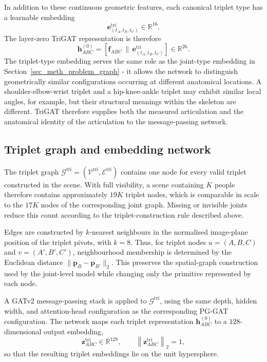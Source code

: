 In addition to these continuous geometric features,
each canonical triplet type has a learnable embedding
\begin{equation}
    \mathbf{e}^{\mathrm{tri}}_{(t_A,t_B,t_C)}
    \in\mathbb{R}^{16}.
\end{equation}
The layer-zero TriGAT representation is therefore
\begin{equation}
    \mathbf{h}^{(0)}_{ABC}
    =
    \left[
        \mathbf{f}_{ABC}
        \,\big\|\,
        \mathbf{e}^{\mathrm{tri}}_{(t_A,t_B,t_C)}
    \right]
    \in\mathbb{R}^{26}.
    \label{eq:trigat_layer0}
\end{equation}
The triplet-type embedding serves the same role
as the joint-type embedding in Section~\ref{sec_meth_problem_graph} -
it allows the network to distinguish geometrically similar
configurations occurring at different anatomical locations.
A shoulder-elbow-wrist triplet and a hip-knee-ankle triplet
may exhibit similar local angles, for example,
but their structural meanings within the skeleton are different.
TriGAT therefore supplies both the measured articulation
and the anatomical identity of the articulation
to the message-passing network.

\subsection{Triplet graph and embedding network}
\label{sec_meth_trigat_arch}

The triplet graph
$\mathcal{G}^{\mathrm{tri}}
= (\mathcal{V}^{\mathrm{tri}},\mathcal{E}^{\mathrm{tri}})$
contains one node for every valid triplet constructed in the scene.
With full visibility, a scene containing $K$ people therefore contains
approximately $19K$ triplet nodes, which is comparable in scale to the
$17K$ nodes of the corresponding joint graph. Missing or invisible
joints reduce this count according to the triplet-construction rule
described above.

Edges are constructed by $k$-nearest neighbours in the normalised
image-plane position of the triplet pivots, with $k=8$. Thus, for
triplet nodes $u=(A,B,C)$ and $v=(A',B',C')$, neighbourhood membership
is determined by the Euclidean distance
$\|\mathbf{p}_B-\mathbf{p}_{B'}\|_2$. This preserves the spatial-graph
construction used by the joint-level model while changing only the
primitive represented by each node.

A GATv2 message-passing stack is applied to
$\mathcal{G}^{\mathrm{tri}}$, using the same depth, hidden width, and
attention-head configuration as the corresponding PG-GAT
configuration. The network maps each triplet representation
$\mathbf{h}^{(0)}_{ABC}$ to a $128$-dimensional output embedding,
\begin{equation}
    \mathbf{z}^{\mathrm{tri}}_{ABC}
    \in \mathbb{R}^{128},
    \qquad
    \left\|
        \mathbf{z}^{\mathrm{tri}}_{ABC}
    \right\|_2 = 1,
    \label{eq:trigat_embedding}
\end{equation}
so that the resulting triplet embeddings lie on the unit hypersphere.

